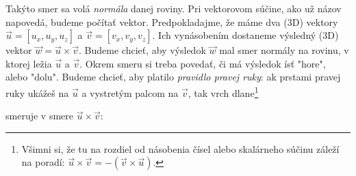 \documentclass[10pt]{article}
\def\ods{\vspace*{10pt}}
\begin{document}
{{}


\ods
Takýto smer sa volá {\em normála} danej roviny. 
Pri vektorovom súčine, ako už názov napovedá, budeme počítať
vektor. Predpokladajme, že máme dva (3D) vektory $\vec u=[u_x,u_y,u_z]$ a $\vec v=[v_x,v_y,v_z]$.
Ich vynásobením dostaneme výsledný (3D) vektor $\vec w = \vec u\times\vec v$. Budeme chcieť, aby výsledok
$\vec w$ mal smer normály na rovinu, v ktorej ležia $\vec u$ a $\vec v$.
Okrem smeru si treba povedať, či má výsledok ísť "hore", alebo "dolu". Budeme chcieť,
aby platilo {\em pravidlo pravej ruky}: ak prstami pravej ruky ukážeš na $\vec u$ a 
vystretým palcom na $\vec v$, tak vrch dlane\footnote{
Všimni si, že tu 
na rozdiel od násobenia čísel alebo skalárneho súčinu záleží na poradí: 
$\vec u\times\vec v = - (\vec v\times\vec u)$.}

smeruje v smere $\vec u\times\vec v$:


\ods
\def\drawaxes{
    \draw[->,red, shorten >= 1ex] (0,0,0) -- (1,0,0) node{$x$};
    \draw[->,blue, shorten >= 1ex] (0,0,0) -- (0,1,0) node{$y$};
    \draw[->,teal, shorten >= 1ex] (0,0,0) -- (0,0,1) node {$z$};
  }


}
\end{document}
